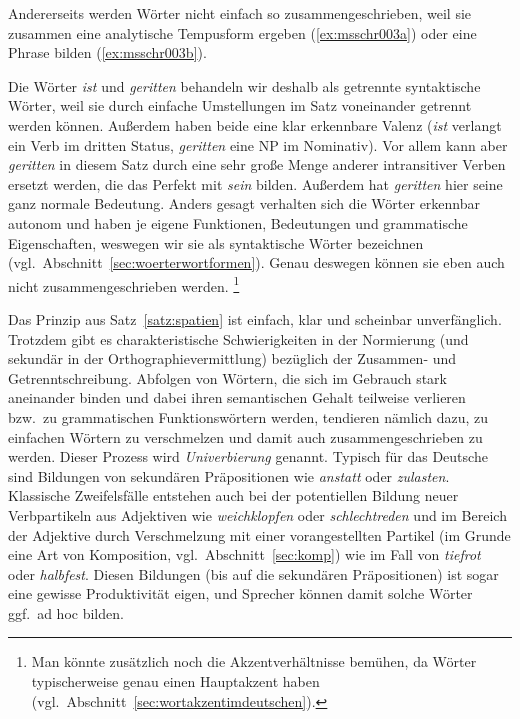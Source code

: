 Andererseits werden Wörter nicht einfach so zusammengeschrieben, \zB weil sie zusammen eine analytische Tempusform ergeben (\ref{ex:msschr003a}) oder eine Phrase bilden (\ref{ex:msschr003b}).

\begin{exe}
  \ex\label{ex:msschr003} 
  \begin{xlist}
  \end{xlist}
\end{exe}

Die Wörter \textit{ist} und \textit{geritten} behandeln wir \zB deshalb als getrennte syntaktische Wörter, weil sie durch einfache Umstellungen im Satz voneinander getrennt werden können.
Außerdem haben beide eine klar erkennbare Valenz (\textit{ist} verlangt ein Verb im dritten Status, \textit{geritten} eine NP im Nominativ).
Vor allem kann aber \textit{geritten} in diesem Satz durch eine sehr große Menge anderer intransitiver Verben ersetzt werden, die das Perfekt mit \textit{sein} bilden.
Außerdem hat \textit{geritten} hier seine ganz normale Bedeutung.
Anders gesagt verhalten sich die Wörter erkennbar autonom und haben je eigene Funktionen, Bedeutungen und grammatische Eigenschaften, weswegen wir sie als syntaktische Wörter bezeichnen (vgl.\ Abschnitt~\ref{sec:woerterwortformen}).
Genau deswegen können sie eben auch nicht zusammengeschrieben werden.%
\footnote{Man könnte zusätzlich noch die Akzentverhältnisse bemühen, da Wörter typischerweise genau einen Hauptakzent haben (vgl.\ Abschnitt~\ref{sec:wortakzentimdeutschen}).}

Das Prinzip aus Satz~\ref{satz:spatien} ist einfach, klar und scheinbar unverfänglich.
Trotzdem gibt es charakteristische Schwierigkeiten in der Normierung (und sekundär in der Orthographievermittlung) bezüglich der Zusammen- und Getrenntschreibung.
Abfolgen von Wörtern, die sich im Gebrauch stark aneinander binden und dabei ihren semantischen Gehalt teilweise verlieren bzw.\ zu grammatischen Funktionswörtern werden, tendieren nämlich dazu, zu einfachen Wörtern zu verschmelzen und damit auch zusammengeschrieben zu werden.
Dieser Prozess wird \textit{Univerbierung} genannt.
Typisch für das Deutsche sind \zB Bildungen von sekundären Präpositionen wie \textit{anstatt} oder \textit{zulasten}.
Klassische Zweifelsfälle entstehen auch bei der potentiellen Bildung neuer Verbpartikeln aus Adjektiven wie \textit{weichklopfen} oder \textit{schlechtreden} und im Bereich der Adjektive durch Verschmelzung mit einer vorangestellten Partikel (im Grunde eine Art von Komposition, vgl.\ Abschnitt~\ref{sec:komp}) wie im Fall von \textit{tiefrot} oder \textit{halbfest}.
Diesen Bildungen (bis auf die sekundären Präpositionen) ist sogar eine gewisse Produktivität eigen, und Sprecher können damit solche Wörter ggf.\ ad hoc bilden.

